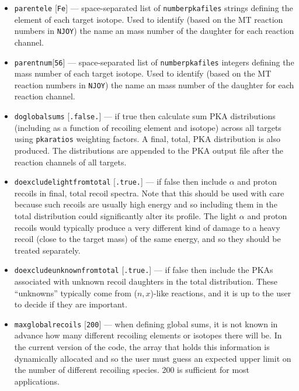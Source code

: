 \documentclass[a4paper]{article}
\begin{document}
\begin{itemize}
\item \texttt{parent{\textunderscore}ele} [\texttt{Fe}] --- space-separated list of \texttt{number{\textunderscore}pka{\textunderscore}files} strings defining the element of each target isotope. Used to identify (based on the MT reaction numbers in \texttt{NJOY}) the name an mass number of the daughter for each reaction channel.
\item \texttt{parent{\textunderscore}num}[\texttt{56}] --- space-separated list of \texttt{number{\textunderscore}pka{\textunderscore}files} integers defining the mass number of each target isotope. Used to identify (based on the MT reaction numbers in \texttt{NJOY}) the name an mass number of the daughter for each reaction channel.
\item \texttt{do{\textunderscore}global{\textunderscore}sums} [\texttt{.false.}] --- if true then calculate sum PKA distributions (including as a function of recoiling element and isotope) across all targets using \texttt{pka{\textunderscore}ratios} weighting factors. A final, total, PKA distribution is also produced. The distributions are appended to the PKA output file after the reaction channels of all targets.
\item \texttt{do{\textunderscore}exclude{\textunderscore}light{\textunderscore}from{\textunderscore}total} [\texttt{.true.}] --- if false then include \(\alpha\) and proton recoils in final, total recoil spectra. Note that this should be used with care because such recoils are usually high energy and so including them in the total distribution could significantly alter its profile. The light \(\alpha\) and proton recoils would typically produce a very different kind of damage to a heavy recoil (close to the target mass) of the same energy, and so they should be treated separately.
\item \texttt{do{\textunderscore}exclude{\textunderscore}unknown{\textunderscore}from{\textunderscore}total} [\texttt{.true.}] --- if false then include the PKAs associated with unknown recoil daughters in the total distribution. These ``unknowns'' typically come from (\(n,x\))-like reactions, and it is up to the user to decide if they are important.
\item \texttt{max{\textunderscore}global{\textunderscore}recoils} [\texttt{200}] --- when defining global sums, it is not known in advance how many different recoiling elements or isotopes there will be. In the current version of the code, the array that holds this information is dynamically allocated and so the user must guess an expected upper limit on the number of different recoiling species. 200 is sufficient for most applications.


\end{itemize}
\end{document}
